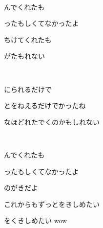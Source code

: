 ~

んでくれたも

ったもしくてなかったよ

ちけてくれたも

がたもれない

~

にられるだけで

とをねえるだけでかったね

なほどれたでくのかもしれない

~

んでくれたも

ったもしくてなかったよ

のがきだよ

これからもずっとをきしめたい

をくきしめたい wow

